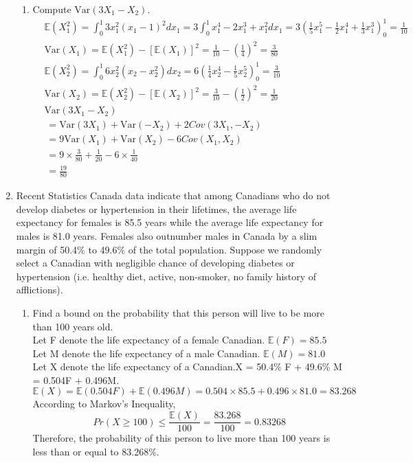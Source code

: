 \documentclass[11pt]{article}
\newcommand{\e}{\mathbb{E}}
\newcommand{\var}{\text{Var}}
\begin{document}
\begin{enumerate}[label=\textbf{Question \arabic*:},start=1]
\begin{enumerate}
	\item Compute $\var(3X_1 - X_2)$.
	\begin{align*}
	& \e(X_1^2) = \int_0^1 3 x_1^2 (x_1 - 1)^2 d x_1 = 3 \int_0^1 x_1^4 - 2x_1^3 + x_1^2 dx_1 =  3 (\frac{1}{5}x_1^5 - \frac{1}{2}x_1^4 + \frac{1}{3} x_1^3)_0^1 =  \frac{1}{10} \\
	& \var(X_1) = \e(X_1^2) - [\e(X_1)]^2  = \frac{1}{10} - (\frac{1}{4})^2 = \frac{3}{80} \\
	& \e(X_2^2) = \int_0^1 6 x_2^2 (x_2 - x_2^2) dx_2 = 6 (\frac{1}{4} x_2^4 - \frac{1}{5} x_2^5)_0^1 = \frac{3}{10} \\
	& \var(X_2) = \e(X_2^2) - [\e(X_2)]^2 =  \frac{3}{10} - (\frac{1}{2})^2 = \frac{1}{20} \\
	& \var(3X_1 - X_2) \\
	&\ =  \var(3X_1) + \var(-X_2) + 2 Cov(3X_1, -X_2) \\
	&\ = 9 \var(X_1) + \var(X_2) - 6Cov(X_1, X_2) \\
	&\ = 9 \times \frac{3}{80} + \frac{1}{20} - 6 \times \frac{1}{40} \\
	&\ = \frac{19}{80}
	\end{align*}

\end{enumerate}


\item 
Recent Statistics Canada data indicate that among Canadians who do not develop diabetes or hypertension in their lifetimes, the average life expectancy for females is 85.5 years while the average life expectancy for males is 81.0 years. Females also outnumber males in Canada by a slim margin of 50.4\% to 49.6\% of the total population. Suppose we randomly select a Canadian with negligible chance of developing diabetes or hypertension (i.e. healthy diet, active, non-smoker, no family history of afflictions).

\begin{enumerate}
  \item Find a bound on the probability that this person will live to be more than 100 years old.\\
  
  Let F denote the life expectancy of a female Canadian. $\e(F) = 85.5$\\
  Let M denote the life expectancy of a male Canadian. $\e(M) = 81.0$\\
  Let X denote the life expectancy of a Canadian.X = 50.4\% F + 49.6\% M = 0.504F + 0.496M. \\
  $\e(X) = \e(0.504F) + \e(0.496M) = 0.504 \times 85.5 + 0.496 \times 81.0 = 83.268 $\\
  According to Markov's Inequality,
  \[
  Pr(X \geq 100) \leq \frac{\e(X)}{100} = \frac{83.268}{100} = 0.83268
  \]
  Therefore, the probability of this person to live more than 100 years is less than or equal to 83.268\%. \\


\end{enumerate}
\end{enumerate}
\end{document}
